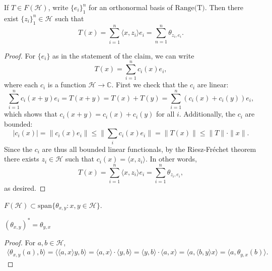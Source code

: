 \documentclass[12pt]{article}
\begin{document}
\begin{proposition}
\label{prop_finite_rank_as_theta}
	If $T\in F(\mathcal{H})$, write $\{e_i\}_1^n$ for an orthonormal basis of $\text{Range(T)}$. Then there exist $\{z_i\}_1^n\in\mathcal{H}$ such that 
	\begin{equation*}
		T(x)=\sum_{i=1}^n\langle x, z_i\rangle e_i = \sum_{n=1}^n \theta_{z_i,e_i}.
	\end{equation*}
\end{proposition}
\begin{proof}
	For $\{e_i\}$ as in the statement of the claim, we can write
	\begin{equation*}
		T(x) = \sum_{i=1}^n c_i(x)e_i,
	\end{equation*}
	where each $c_i$ is a function $\mathcal{H}\to \mathbb{C}$. First we check that the $c_i$ are linear:
	\begin{equation*}
		\sum_{i=1}^n c_i(x+y)e_i = T(x+y) = T(x) + T(y) = \sum_{i=1}^n (c_i(x)+c_i(y))e_i,
	\end{equation*}
	which shows that $c_i(x+y)=c_i(x)+c_i(y)$ for all $i$. Additionally, the $c_i$ are bounded:
	\begin{equation*}
		|c_i(x)|=\|c_i(x)e_i\|\leq\|\sum_{i}c_i(x)e_i\|=\|T(x)\|\leq \|T\|\cdot\|x\|.
	\end{equation*}	
	Since the $c_i$ are thus all bounded linear functionals, by the Riesz-Fr\'echet theorem there exists $z_i\in \mathcal{H}$ such that $c_i(x)=\langle x,z_i\rangle$. In other words,
	\begin{equation*}
		T(x)= \sum_{i=1}^n \langle x, z_i\rangle e_i=\sum_{i=1}^n \theta_{z_i, e_i},
	\end{equation*}
	as desired.
\end{proof}

\begin{corollary}
	$F(\mathcal{H})\subset\text{span}\{\theta_{x,y} : x,y\in\mathcal{H}\}$.
\end{corollary}

\begin{proposition}
\label{prop_theta_adjoint}
	$(\theta_{x,y})^\ast = \theta_{y,x}$
\end{proposition}
\begin{proof}
	For $a,b\in \mathcal{H}$, 
\begin{gather*}
	\langle \theta_{x,y}(a), b\rangle = \langle \langle a, x\rangle y, b\rangle = \langle a,x\rangle\cdot\langle y,b\rangle = \langle y,b\rangle\cdot\langle a, x\rangle = \langle a, \langle b,y\rangle x\rangle = \langle a, \theta_{y,x}(b)\rangle.
\end{gather*}
\end{proof}
\end{document}
